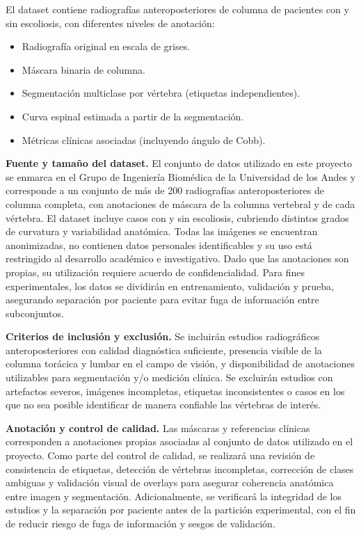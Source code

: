 \documentclass[8pt,a4paper]{article}
\begin{document}
\begin{enumerate}[leftmargin=0.8cm,label=\arabic*.,itemsep=0.85em]
    El dataset contiene radiografías anteroposteriores de columna de pacientes con y sin escoliosis, con diferentes niveles de anotación:
    \begin{itemize}[leftmargin=0.6cm]
        \item Radiografía original en escala de grises.
        \item Máscara binaria de columna.
        \item Segmentación multiclase por vértebra (etiquetas independientes).
        \item Curva espinal estimada a partir de la segmentación.
        \item Métricas clínicas asociadas (incluyendo ángulo de Cobb).
    \end{itemize}

    \textbf{Fuente y tamaño del dataset.} El conjunto de datos utilizado en este proyecto se enmarca en el Grupo de Ingeniería Biomédica de la Universidad de los Andes y corresponde a un conjunto de más de 200 radiografías anteroposteriores de columna completa, con anotaciones de máscara de la columna vertebral y de cada vértebra. El dataset incluye casos con y sin escoliosis, cubriendo distintos grados de curvatura y variabilidad anatómica. Todas las imágenes se encuentran anonimizadas, no contienen datos personales identificables y su uso está restringido al desarrollo académico e investigativo. Dado que las anotaciones son propias, su utilización requiere acuerdo de confidencialidad. Para fines experimentales, los datos se dividirán en entrenamiento, validación y prueba, asegurando separación por paciente para evitar fuga de información entre subconjuntos.

\textbf{Criterios de inclusión y exclusión.} Se incluirán estudios radiográficos anteroposteriores con calidad diagnóstica suficiente, presencia visible de la columna torácica y lumbar en el campo de visión, y disponibilidad de anotaciones utilizables para segmentación y/o medición clínica. Se excluirán estudios con artefactos severos, imágenes incompletas, etiquetas inconsistentes o casos en los que no sea posible identificar de manera confiable las vértebras de interés.

\textbf{Anotación y control de calidad.} Las máscaras y referencias clínicas corresponden a anotaciones propias asociadas al conjunto de datos utilizado en el proyecto. Como parte del control de calidad, se realizará una revisión de consistencia de etiquetas, detección de vértebras incompletas, corrección de clases ambiguas y validación visual de overlays para asegurar coherencia anatómica entre imagen y segmentación. Adicionalmente, se verificará la integridad de los estudios y la separación por paciente antes de la partición experimental, con el fin de reducir riesgo de fuga de información y sesgos de validación.


\end{enumerate}
\end{document}
